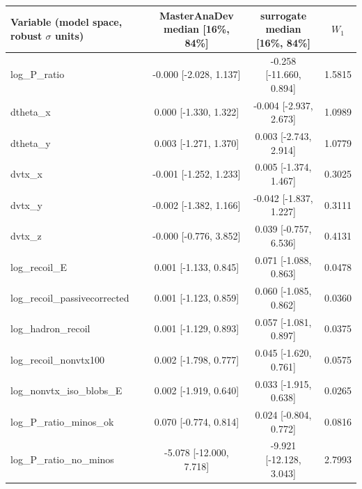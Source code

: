 \begin{tabular}{lccc}
\toprule
Variable (model space, robust $\sigma$ units) & MasterAnaDev median [16\%, 84\%] & surrogate median [16\%, 84\%] & $W_1$ \\
\midrule
log\_P\_ratio & -0.000 [-2.028, 1.137] & -0.258 [-11.660, 0.894] & 1.5815 \\
dtheta\_x & 0.000 [-1.330, 1.322] & -0.004 [-2.937, 2.673] & 1.0989 \\
dtheta\_y & 0.003 [-1.271, 1.370] & 0.003 [-2.743, 2.914] & 1.0779 \\
dvtx\_x & -0.001 [-1.252, 1.233] & 0.005 [-1.374, 1.467] & 0.3025 \\
dvtx\_y & -0.002 [-1.382, 1.166] & -0.042 [-1.837, 1.227] & 0.3111 \\
dvtx\_z & -0.000 [-0.776, 3.852] & 0.039 [-0.757, 6.536] & 0.4131 \\
log\_recoil\_E & 0.001 [-1.133, 0.845] & 0.071 [-1.088, 0.863] & 0.0478 \\
log\_recoil\_passivecorrected & 0.001 [-1.123, 0.859] & 0.060 [-1.085, 0.862] & 0.0360 \\
log\_hadron\_recoil & 0.001 [-1.129, 0.893] & 0.057 [-1.081, 0.897] & 0.0375 \\
log\_recoil\_nonvtx100 & 0.002 [-1.798, 0.777] & 0.045 [-1.620, 0.761] & 0.0575 \\
log\_nonvtx\_iso\_blobs\_E & 0.002 [-1.919, 0.640] & 0.033 [-1.915, 0.638] & 0.0265 \\
log\_P\_ratio\_minos\_ok & 0.070 [-0.774, 0.814] & 0.024 [-0.804, 0.772] & 0.0816 \\
log\_P\_ratio\_no\_minos & -5.078 [-12.000, 7.718] & -9.921 [-12.128, 3.043] & 2.7993 \\
\bottomrule
\end{tabular}
